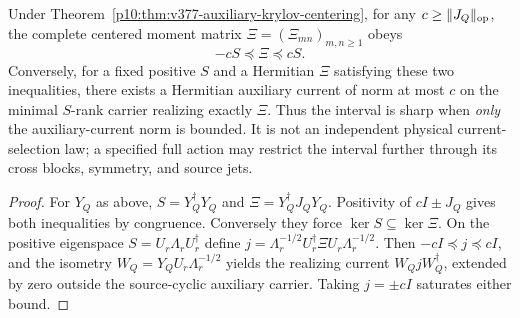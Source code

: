 \documentclass[12pt,a4paper]{article}
\begin{document}
\begin{corollary}
\label{p10:cor:v377-auxiliary-current-gram-envelope}
Under Theorem~\ref{p10:thm:v377-auxiliary-krylov-centering},
for any $c\ge\|J_Q\|_{\rm op}$, the complete centered moment matrix
$\Xi=(\Xi_{mn})_{m,n\ge1}$ obeys
\[
 \boxed{-cS\preceq\Xi\preceq cS.}
\]
Conversely, for a fixed positive $S$ and a Hermitian $\Xi$ satisfying
these two inequalities, there exists a Hermitian auxiliary current of
norm at most $c$ on the minimal $S$-rank carrier realizing exactly
$\Xi$. Thus the interval is sharp when \emph{only} the auxiliary-current
norm is bounded. It is not an independent physical current-selection law;
a specified full action may restrict the interval further through its
cross blocks, symmetry, and source jets.
\end{corollary}
\begin{proof}
For $Y_Q$ as above, $S=Y_Q^\dagger Y_Q$ and
$\Xi=Y_Q^\dagger J_QY_Q$. Positivity of $cI\pm J_Q$
gives both inequalities by congruence. Conversely they force
$\ker S\subseteq\ker\Xi$. On the positive eigenspace
$S=U_r\Lambda_rU_r^\dagger$ define
$j=\Lambda_r^{-1/2}U_r^\dagger\Xi U_r\Lambda_r^{-1/2}$.
Then $-cI\preceq j\preceq cI$, and the isometry
$W_Q=Y_QU_r\Lambda_r^{-1/2}$ yields the realizing current
$W_QjW_Q^\dagger$, extended by zero outside the source-cyclic
auxiliary carrier. Taking $j=\pm cI$ saturates either bound.
\end{proof}
\end{document}
